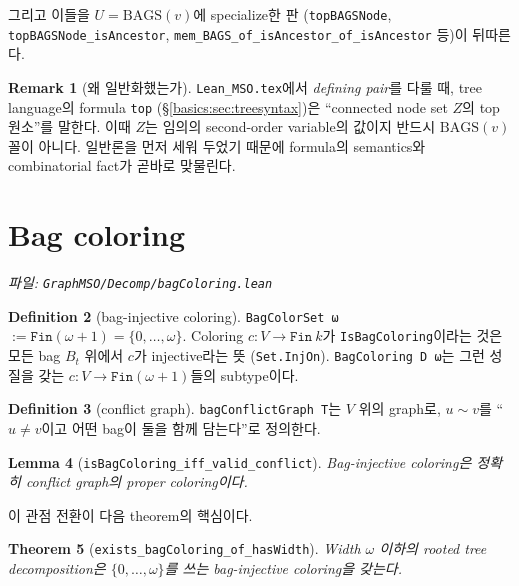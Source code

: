 \documentclass[11pt]{article}
\theoremstyle{definition}
\newtheorem{definition}{Definition}[section]
\newtheorem{remark}[definition]{Remark}
\theoremstyle{plain}
\newtheorem{theorem}[definition]{Theorem}
\newtheorem{lemma}[definition]{Lemma}
\newcommand{\lean}[1]{\texttt{#1}}
\newcommand{\leanfile}[1]{\texttt{#1}}
\begin{document}
그리고 이들을 $U = \mathrm{BAGS}(v)$에 specialize한 판
(\lean{topBAGSNode}, \lean{topBAGSNode\_isAncestor},
\lean{mem\_BAGS\_of\_isAncestor\_of\_isAncestor} 등)이 뒤따른다.

\begin{remark}[왜 일반화했는가]
\leanfile{Lean\_MSO.tex}에서 \emph{defining pair}를 다룰 때, tree language의
formula \lean{top} (\S\ref{basics:sec:treesyntax})은 ``connected node set $Z$의
top 원소''를 말한다. 이때 $Z$는 임의의 second-order variable의 값이지 반드시
$\mathrm{BAGS}(v)$ 꼴이 아니다. 일반론을 먼저 세워 두었기 때문에 formula의
semantics와 combinatorial fact가 곧바로 맞물린다.
\end{remark}

\section{Bag coloring}
\label{basics:sec:bagcoloring}

\emph{파일: \leanfile{GraphMSO/Decomp/bagColoring.lean}}

\begin{definition}[bag-injective coloring]
\label{basics:def:bagcoloring}
\lean{BagColorSet ω} $:= \lean{Fin}(\omega+1) = \{0,\dots,\omega\}$.
Coloring $c : V \to \lean{Fin}\ k$가 \lean{IsBagColoring}이라는 것은 모든
bag $B_t$ 위에서 $c$가 injective라는 뜻 (\lean{Set.InjOn}).
\lean{BagColoring D ω}는 그런 성질을 갖는 $c : V \to \lean{Fin}(\omega+1)$들의
subtype이다.
\end{definition}

\begin{definition}[conflict graph]
\label{basics:def:conflictgraph}
\lean{bagConflictGraph T}는 $V$ 위의 graph로, $u \sim v$를 ``$u \ne v$이고
어떤 bag이 둘을 함께 담는다''로 정의한다.
\end{definition}

\begin{lemma}[\lean{isBagColoring\_iff\_valid\_conflict}]
\label{basics:lem:conflictiff}
Bag-injective coloring은 정확히 conflict graph의 proper coloring이다.
\end{lemma}

이 관점 전환이 다음 theorem의 핵심이다.

\begin{theorem}[\lean{exists\_bagColoring\_of\_hasWidth}]
\label{basics:thm:existsbagcoloring}
Width $\omega$ 이하의 rooted tree decomposition은 $\{0,\dots,\omega\}$를 쓰는
bag-injective coloring을 갖는다.
\end{theorem}
\end{document}
